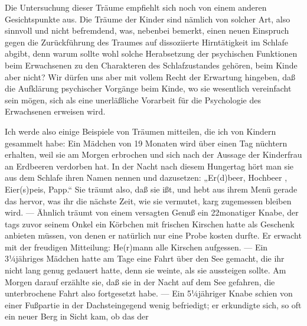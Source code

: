 \documentclass{article}
\begin{document}
         
            
            
            
        \pstart
        Die Untersuchung dieser Träume empfiehlt sich noch von einem anderen
               Gesichtspunkte aus. Die Träume der Kinder sind nämlich von solcher Art, also sinnvoll und nicht befremdend, was,
               nebenbei bemerkt, einen neuen Einspruch gegen die Zurückführung des
               Traumes auf dissoziierte Hirntätigkeit im Schlafe abgibt, denn warum sollte wohl
               solche Herabsetzung der psychischen Funktionen beim Erwachsenen zu
               den Charakteren des Schlafzustandes gehören, beim Kinde aber nicht? Wir dürfen
               uns aber mit vollem Recht der Erwartung hingeben, daß die Aufklärung psychischer Vorgänge beim Kinde, wo sie wesentlich vereinfacht sein mögen, sich als eine unerläßliche Vorarbeit für die Psychologie
               des Erwachsenen erweisen wird.
        \pend
    
            
        \pstart
        Ich werde also einige Beispiele von Träumen mitteilen, die ich von Kindern
               gesammelt habe: Ein Mädchen von 19 Monaten wird über einen Tag nüchtern
               erhalten, weil sie am Morgen erbrochen und sich nach der Aussage der Kinderfrau
               an Erdbeeren verdorben hat. In der Nacht nach diesem Hungertag
               hört man sie aus dem Schlafe ihren Namen nennen und dazusetzen: „Er(d)beer, Hochbeer
    , Eier(s)peis, Papp.“ 
     Sie träumt also,
               daß sie ißt, und hebt aus ihrem Menü gerade das hervor, was ihr die nächste
               Zeit, wie sie vermutet, karg zugemessen bleiben wird. — Ähnlich träumt von einem
               versagten Genuß ein 22monatiger Knabe, der tags zuvor seinem Onkel
               ein Körbchen mit frischen Kirschen hatte als Geschenk anbieten müssen, von
               denen er natürlich nur eine Probe kosten durfte. Er erwacht mit der
               freudigen Mitteilung: He(r)mann alle Kirschen aufgessen.
               — Ein 3¼jähriges Mädchen hatte am Tage eine Fahrt über den See gemacht, die
               ihr nicht lang genug gedauert hatte, denn sie weinte, als sie aussteigen sollte.
               Am Morgen darauf erzählte sie, daß sie in der Nacht auf dem See gefahren, die
               unterbrochene Fahrt also fortgesetzt habe. — Ein 5¼jähriger Knabe schien
               von einer Fußpartie in der Dachsteingegend wenig befriedigt; er erkundigte
               sich, so oft ein neuer Berg in Sicht kam, ob das der
        \pend
    
\end{document}
